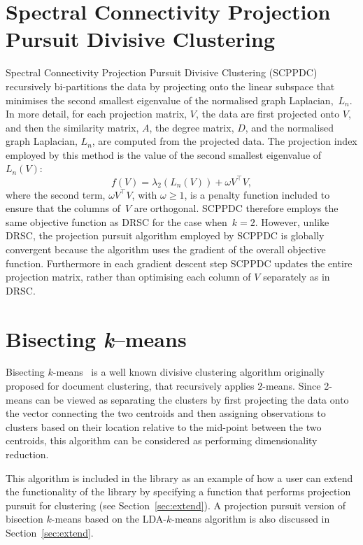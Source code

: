 \documentclass{book}
\begin{document}
\section{Spectral Connectivity Projection Pursuit Divisive Clustering}

Spectral Connectivity Projection Pursuit Divisive Clustering
(SCPPDC)~\cite{HofmeyrPE2018} recursively bi-partitions the data by projecting
onto the linear subspace that minimises the second smallest eigenvalue of the
normalised graph Laplacian,~$L_n$. 
%
In more detail, for each projection matrix, $V$, the data are first projected
onto $V$, and then the similarity matrix, $A$, the degree matrix, $D$, and the normalised graph
Laplacian, $L_n$, are computed from the projected data.
%
The projection index employed by this method is the value of the second
smallest eigenvalue of $L_n(V)$:
%
\[ f(V) = \lambda_2 \left(L_n(V) \right) + \omega V^\top V, \]
%
where the second term, $\omega V^\top V$, with
$\omega \geqslant 1$, is a penalty function included to ensure that the columns
of~$V$ are orthogonal.
%
SCPPDC therefore employs the same objective function as DRSC for the case when~$k=2$.
However, unlike DRSC, the projection pursuit algorithm employed by
SCPPDC is globally convergent because the algorithm uses the gradient of the
overall objective function. Furthermore in each gradient descent step SCPPDC
updates the entire projection matrix, rather than optimising each column of $V$
separately as in DRSC. 


\section{Bisecting {\it k}--means}

Bisecting $k$-means~\cite{SteinbachKK2000} is a well known divisive clustering
algorithm originally proposed for document clustering, that recursively applies
$2$-means. Since 2-means can be viewed as separating the clusters by first
projecting the data onto the vector connecting the two centroids and then
assigning observations to clusters based on their location relative to the
mid-point between the two centroids,
%
%
this algorithm can be considered as performing dimensionality reduction.

This algorithm is included in the library as an example of how a user can
extend the functionality of the library by specifying a function that performs
projection pursuit for clustering (see Section~\ref{sec:extend}).
%
A projection pursuit version of bisection $k$-means based on the
LDA-$k$-means algorithm is also discussed in Section~\ref{sec:extend}.
\end{document}
